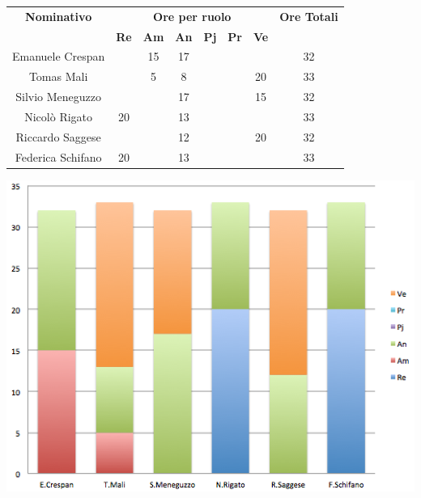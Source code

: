 \begin{center}
  \centering
  \begin{tabular} {|c|c|c|c|c|c|c|c|}
    \hline
    \textbf{Nominativo} & \multicolumn{6}{|c|}{\textbf{Ore per ruolo}} & \textbf{Ore Totali} \\
    & \textbf{Re} & \textbf{Am} & \textbf{An} & \textbf{Pj} & \textbf{Pr} & \textbf{Ve} & \\
    \hline
    Emanuele Crespan & & 15 & 17 & & & & 32\\
    \hline
    Tomas Mali &  & 5 & 8 & & & 20 & 33\\
    \hline
    Silvio Meneguzzo & & & 17 & & & 15 & 32\\
    \hline
    Nicolò Rigato & 20 & & 13 & & &  & 33\\
    \hline
    Riccardo Saggese & & & 12 & & & 20 & 32\\
    \hline
    Federica Schifano & 20 & & 13 & & & & 33\\
    \hline
  \end{tabular}
  \includegraphics[scale=0.65]{img/fig1.png}
\end{center}

